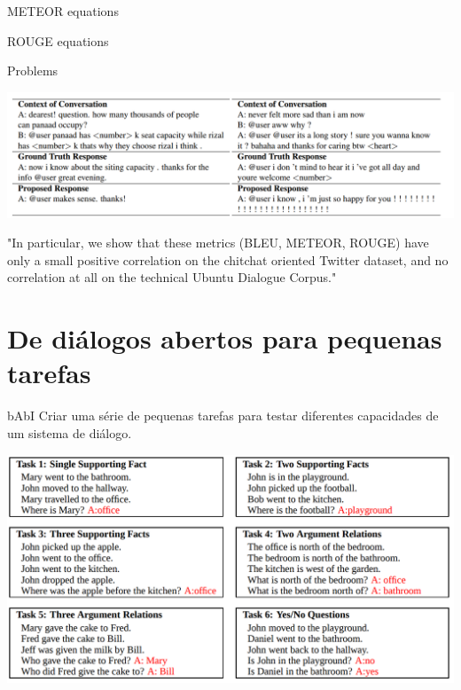 \documentclass[10pt]{beamer}
\begin{document}
\begin{frame}{METEOR}
equations
\end{frame}

\begin{frame}{ROUGE}
equations
\end{frame}


\begin{frame}{Problems}
\begin{center}
\includegraphics[scale=0.23]{images/weak_corr.png}
\end{center}

"In particular, we show that these metrics (BLEU, METEOR, ROUGE) have only a small positive correlation on the chitchat oriented Twitter dataset, and no correlation at all on the technical Ubuntu Dialogue Corpus." \cite{LiuLSNCP16}

\end{frame}

\section{De diálogos abertos para pequenas tarefas}

\begin{frame}{bAbI \cite{WestonBCM15}}
Criar uma série de pequenas tarefas para testar diferentes capacidades de um sistema de diálogo.


\begin{center}
\includegraphics[scale=0.25]{images/babi.png}
\end{center}
\end{frame}
\end{document}
